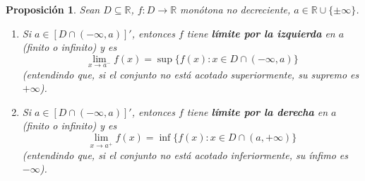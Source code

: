 \documentclass[12pt]{article}
\newtheorem{proposition}[theorem]{Proposición}
\begin{document}
\begin{proposition}Sean $D \subseteq \mathbb{R}$, $f \colon D \longrightarrow \mathbb{R}$ monótona no decreciente, $a \in \mathbb{R} \cup \lbrace \pm \infty \rbrace$. 
\begin{enumerate}
\item Si $a \in [D \cap (- \infty, a)]'$, entonces $f$ tiene \textbf{límite por la izquierda} en $a$ (finito o infinito) y es $$\lim_{x \rightarrow a^-} f(x) = \sup \lbrace f(x) : x \in D \cap (-\infty,a) \rbrace$$ (entendindo que, si el conjunto no está acotado superiormente, su supremo es $+ \infty$).
\item Si $a \in [D \cap (- \infty, a)]'$, entonces $f$ tiene \textbf{límite por la derecha} en $a$ (finito o infinito) y es $$\lim_{x \rightarrow a^+} f(x) = \inf \lbrace f(x) : x \in D \cap (a,+\infty) \rbrace$$ (entendindo que, si el conjunto no está acotado inferiormente, su ínfimo es $- \infty$).
\end{enumerate}
\end{proposition}
\end{document}
